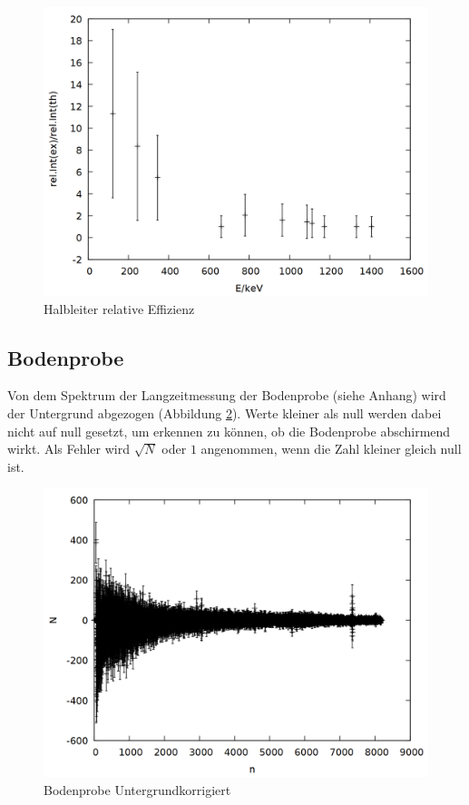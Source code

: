 \begin{figure}[h]
\centering
\includegraphics[width=0.7\linewidth]{data/ge_relint.png}
\caption{Halbleiter relative Effizienz}
\label{fig:ge_relint}
\end{figure}

\newpage

\subsection{Bodenprobe}
Von dem Spektrum der Langzeitmessung der Bodenprobe (siehe Anhang) wird der Untergrund abgezogen (Abbildung \ref{fig:erde}). Werte kleiner als null werden dabei nicht auf null gesetzt, um erkennen zu können, ob die Bodenprobe abschirmend wirkt. Als Fehler wird $\sqrt{N}$ oder $1$ angenommen, wenn die Zahl kleiner gleich null ist.

\begin{figure}[!h]
\centering
\includegraphics[width=0.7\linewidth]{data/erde.png}
\caption{Bodenprobe Untergrundkorrigiert}
\label{fig:erde}
\end{figure}

